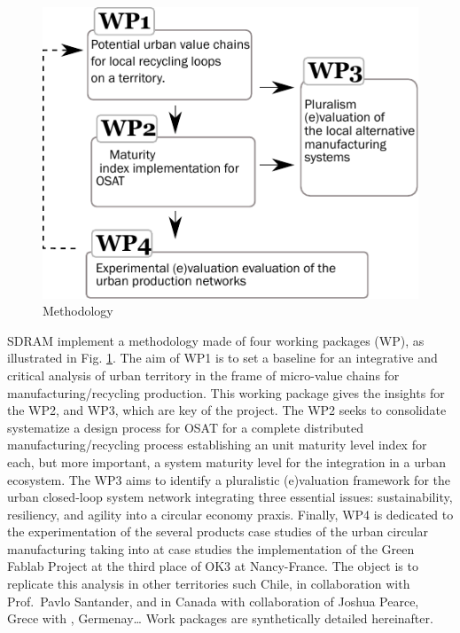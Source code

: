 \documentclass[
  11pt,
  a4paperpaper,
  onecolumn]{article}
\begin{document}
\begin{figure}
\centering
    \includegraphics[width=\linewidth]{Figures/WPs.pdf}
    \caption{Methodology}
    \label{fig:WPs}
\end{figure}

SDRAM implement a methodology made of four working packages (WP), as
illustrated in Fig. \ref{fig:WPs}. The aim of WP1 is to set a baseline
for an integrative and critical analysis of urban territory in the frame
of micro-value chains for manufacturing/recycling production. This
working package gives the insights for the WP2, and WP3, which are key
of the project. The WP2 seeks to consolidate systematize a design
process for OSAT for a complete distributed manufacturing/recycling
process establishing an unit maturity level index for each, but more
important, a system maturity level for the integration in a urban
ecosystem. The WP3 aims to identify a pluralistic (e)valuation framework
for the urban closed-loop system network integrating three essential
issues: sustainability, resiliency, and agility into a circular economy
praxis. Finally, WP4 is dedicated to the experimentation of the several
products case studies of the urban circular manufacturing taking into at
case studies the implementation of the Green Fablab Project at the third
place of OK3 at Nancy-France. The object is to replicate this analysis
in other territories such Chile, in collaboration with Prof.~Pavlo
Santander, and in Canada with collaboration of Joshua Pearce, Grece with
, Germenay\ldots{} Work packages are synthetically detailed hereinafter.
\end{document}
